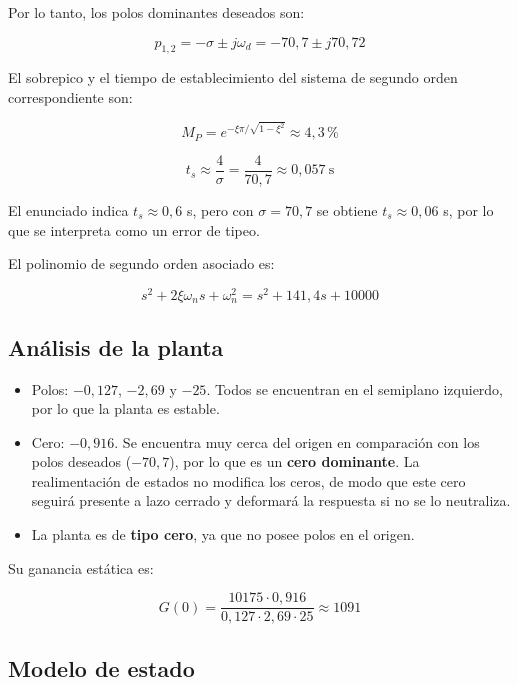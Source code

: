 \documentclass[12pt,a4paper]{article}
\begin{document}
Por lo tanto, los polos dominantes deseados son:

\begin{equation}\boxed{p_{1,2}=-\sigma\pm j\omega_d=-70{,}7\pm j70{,}72}\end{equation}

El sobrepico y el tiempo de establecimiento del sistema de segundo orden correspondiente son:

\begin{equation}M_P=e^{-\xi\pi/\sqrt{1-\xi^2}}\approx4{,}3\,\text{\%}\end{equation}

\begin{equation}t_s\approx\frac{4}{\sigma}=\frac{4}{70{,}7}\approx0{,}057\ \mathrm{s}\end{equation}

El enunciado indica $t_s\approx0{,}6$ s, pero con $\sigma=70{,}7$ se obtiene $t_s\approx0{,}06$ s, por lo que se interpreta como un error de tipeo.

El polinomio de segundo orden asociado es:

\begin{equation}s^2+2\xi\omega_ns+\omega_n^2=s^2+141{,}4s+10000\end{equation}
\subsection*{Análisis de la planta}
\begin{itemize}
\item Polos: $-0{,}127$, $-2{,}69$ y $-25$. Todos se encuentran en el semiplano izquierdo, por lo que la planta es estable.
\item Cero: $-0{,}916$. Se encuentra muy cerca del origen en comparación con los polos deseados ($-70{,}7$), por lo que es un \textbf{cero dominante}. La realimentación de estados no modifica los ceros, de modo que este cero seguirá presente a lazo cerrado y deformará la respuesta si no se lo neutraliza.
\item La planta es de \textbf{tipo cero}, ya que no posee polos en el origen.
\end{itemize}

Su ganancia estática es:

\begin{equation}G(0)=\frac{10175\cdot0{,}916}{0{,}127\cdot2{,}69\cdot25}\approx1091\end{equation}
\subsection*{Modelo de estado}
\end{document}
